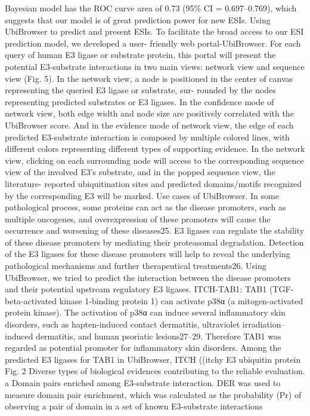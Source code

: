 Bayesian model has the ROC curve area of 0.73 (95\% CI =
0.697–0.769), which suggests that our model is of great prediction
power for new ESIs.
Using UbiBrowser to predict and present ESIs. To facilitate the
broad access to our ESI prediction model, we developed a user-
friendly web portal-UbiBrowser. For each query of human E3
ligase or substrate protein, this portal will present the potential
E3-substrate interactions in two main views: network view and
sequence view (Fig. 5).
In the network view, a node is positioned in the center of
canvas representing the queried E3 ligase or substrate, sur-
rounded by the nodes representing predicted substrates or E3
ligases. In the conﬁdence mode of network view, both edge width
and node size are positively correlated with the UbiBrowser score.
And in the evidence mode of network view, the edge of each
predicted E3-substrate interaction is composed by multiple
colored lines, with different colors representing different types
of supporting evidence.
In the network view, clicking on each surrounding node will
access to the corresponding sequence view of the involved E3’s
substrate, and in the popped sequence view, the literature-
reported ubiquitination sites and predicted domains/motifs
recognized by the corresponding E3 will be marked.
Use cases of UbiBrowser. In some pathological process, some
proteins can act as the disease promoters, such as multiple
oncogenes, and overexpression of these promoters will cause the
occurrence and worsening of these diseases25. E3 ligases can
regulate the stability of these disease promoters by mediating
their proteasomal degradation. Detection of the E3 ligases for
these disease promoters will help to reveal the underlying
pathological mechanisms and further therapeutical treatments26.
Using UbiBrowser, we tried to predict the interaction between the
disease promoters and their potential upstream regulatory E3
ligases.
ITCH-TAB1:
TAB1
(TGF-beta-activated
kinase
1-binding
protein 1) can activate p38α (a mitogen-activated protein kinase).
The activation of p38α can induce several inﬂammatory skin
disorders, such as hapten-induced contact dermatitis, ultraviolet
irradiation–induced dermatitis, and human psoriatic lesions27–29.
Therefore
TAB1
was
regarded
as
potential
promoter
for
inﬂammatory skin disorders. Among the predicted E3 ligases
for TAB1 in UbiBrowser, ITCH ((itchy E3 ubiquitin protein
Fig. 2 Diverse types of biological evidences contributing to the reliable evaluation. a Domain pairs enriched among E3-substrate interaction. DER was used
to measure domain pair enrichment, which was calculated as the probability (Pr) of observing a pair of domain in a set of known E3-substrate interactions
